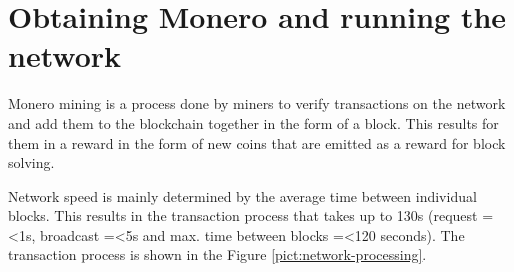 \documentclass[
  printed, %
  table,   %
  lof,     %
  lot,     %
           oneside, color
]{fithesis3}
\begin{document}
\chapter{Obtaining Monero and running the network}
\label{cha:obtaining}
Monero mining is a process done by miners to verify transactions on the network and add them to the blockchain together in the form of a block. This results for them in a reward in the form of new coins that are emitted as a reward for block solving.

Network speed is mainly determined by the average time between individual blocks. %
This results in the transaction process that takes up to 130s (request =\textless 1s, broadcast =\textless 5s and max. time between blocks =\textless 120 seconds).  The transaction process is shown in the Figure \ref{pict:network-processing}.
\end{document}
